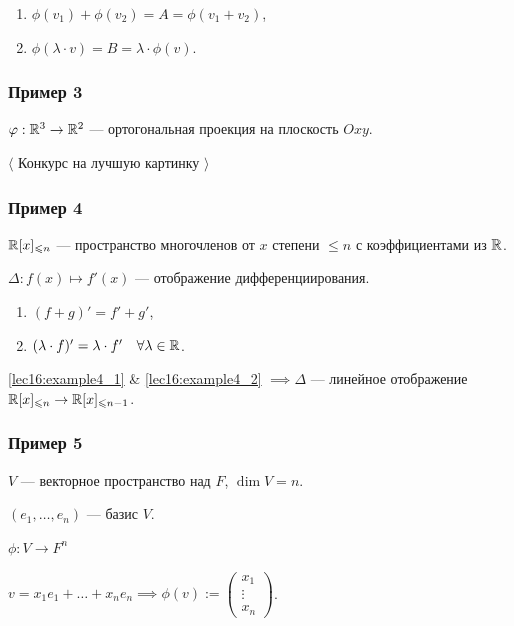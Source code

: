 \bigskip
\begin{enumerate}[label=\arabic*), nosep]
\item $\phi(v_1) + \phi(v_2) = A = \phi(v_1 + v_2)$,
\item $\phi(\lambda \cdot v) = B = \lambda \cdot \phi(v)$.
\end{enumerate}

\subsubsection{Пример 3}

$\varphi: \mathbb{R}^3 \to \mathbb{R}^2$ --- ортогональная проекция на плоскость $Oxy$.

\begin{center}
    $\langle$ Конкурс на лучшую картинку $\rangle$
\end{center}

\subsubsection{Пример 4}

$\mathbb{R}[x]_{\leqslant n}$ --- пространство многочленов от $x$ степени $\leq n$ с коэффициентами из $\mathbb{R}$.

$\Delta : f(x) \mapsto f'(x)$ --- отображение дифференциирования.

\bigskip
\begin{enumerate}[label=\arabic*), nosep]
\item \label{lec16:example4_1} $(f + g)' = f' + g'$,
\item \label{lec16:example4_2} $(\lambda \cdot f)' = \lambda \cdot f' \quad \forall \lambda \in \mathbb{R}$.
\end{enumerate}

\bigskip
\ref{lec16:example4_1} \& \ref{lec16:example4_2} $\implies \Delta $ --- линейное отображение $\mathbb{R}[x]_{\leqslant n} \to \mathbb{R}[x]_{\leqslant n - 1}$.

\subsubsection{Пример 5}
\label{lec16:example_5}

$V$ --- векторное пространство над $F$, $\dim V = n$.

$(e_1, \dots, e_n)$ --- базис $V$.

$\phi : V \to F^n$

$v = x_1 e_1 + \dots + x_n e_n \implies \phi(v) := \begin{pmatrix} x_1 \\ \vdots \\ x_n \end{pmatrix}$.

